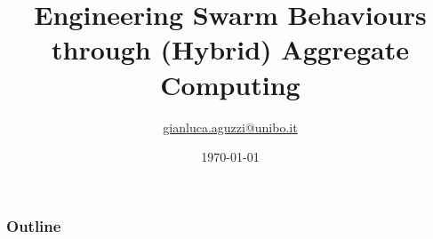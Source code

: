 \documentclass[presentation, 9pt]{beamer}\mode<presentation>{\usetheme{AMSBolognaFC}}
\title[Engineering Swarm Behaviours through HAC]
{Engineering Swarm Behaviours through (Hybrid) Aggregate Computing}
\author[\sspeaker{Aguzzi}]
{\speaker{Gianluca Aguzzi} \href{mailto:gianluca.aguzzi@unibo.it}{gianluca.aguzzi@unibo.it} }
\institute[DISI, Univ.\ Bologna]
{%
\textsc{Alma Mater Studiorum} -- Universit{\`a} di Bologna \\[0.1cm]
}
\date[\today]{\today}
\begin{document}

\frame{\titlepage}
\begin{frame}
\frametitle{Outline}
\tableofcontents
\end{frame}
\end{document}
